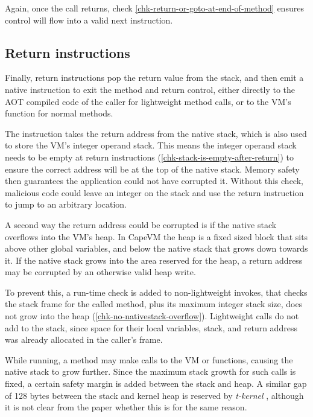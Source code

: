 Again, once the call returns, check \ref{chk-return-or-goto-at-end-of-method} ensures control will flow into a valid next instruction.

\subsection{Return instructions}
\label{sec-control-flow-safety-return-instructions}
Finally, return instructions pop the return value from the stack, and then emit a native  instruction to exit the method and return control, either directly to the AOT compiled code of the caller for lightweight method calls, or to the VM's  function for normal methods.

The  instruction takes the return address from the native stack, which is also used to store the VM's integer operand stack. This means the integer operand stack needs to be empty at return instructions (\ref{chk-stack-is-empty-after-return}) to ensure the correct address will be at the top of the native stack. Memory safety then guarantees the application could not have corrupted it. Without this check, malicious code could leave an integer on the stack and use the return instruction to jump to an arbitrary location.

A second way the return address could be corrupted is if the native stack overflows into the VM's heap. In CapeVM the heap is a fixed sized block that sits above other global variables, and below the native stack that grows down towards it. If the native stack grows into the area reserved for the heap, a return address may be corrupted by an otherwise valid heap write.

To prevent this, a run-time check is added to non-lightweight invokes, that checks the stack frame for the called method, plus its maximum integer stack size, does not grow into the heap (\ref{chk-no-nativestack-overflow}). Lightweight calls do not add to the stack, since space for their local variables, stack, and return address was already allocated in the caller's frame.

While running, a method may make calls to the VM or  functions, causing the native stack to grow further. Since the maximum stack growth for such calls is fixed, a certain safety margin is added between the stack and heap. A similar gap of 128 bytes between the stack and kernel heap is reserved by \emph{t-kernel} \cite{Gu:2005un}, although it is not clear from the paper whether this is for the same reason.




